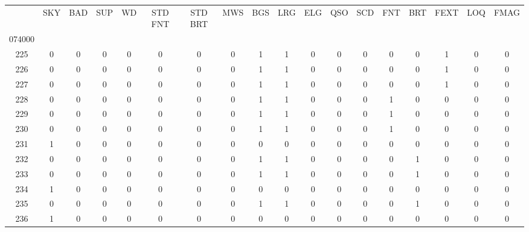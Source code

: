 \begin{tabular}{|c|c|c|c|c|c|c|c|c|c|c|c|c|c|c|c|c|c|}\toprule{} &  SKY &  BAD &  SUP &  WD &  STD FNT &  STD BRT &  MWS &  BGS &  LRG &  ELG &  QSO &  SCD &  FNT &  BRT &  FEXT &  LOQ &  FMAG \\074000 &      &      &      &     &          &          &      &      &      &      &      &      &      &      &       &      &       \\\midrule225    &    0 &    0 &    0 &   0 &        0 &        0 &    0 &    1 &    1 &    0 &    0 &    0 &    0 &    0 &     1 &    0 &     0 \\
\midrule
226    &    0 &    0 &    0 &   0 &        0 &        0 &    0 &    1 &    1 &    0 &    0 &    0 &    0 &    0 &     1 &    0 &     0 \\
\midrule
227    &    0 &    0 &    0 &   0 &        0 &        0 &    0 &    1 &    1 &    0 &    0 &    0 &    0 &    0 &     1 &    0 &     0 \\
\midrule
228    &    0 &    0 &    0 &   0 &        0 &        0 &    0 &    1 &    1 &    0 &    0 &    0 &    1 &    0 &     0 &    0 &     0 \\
\midrule
229    &    0 &    0 &    0 &   0 &        0 &        0 &    0 &    1 &    1 &    0 &    0 &    0 &    1 &    0 &     0 &    0 &     0 \\
\midrule
230    &    0 &    0 &    0 &   0 &        0 &        0 &    0 &    1 &    1 &    0 &    0 &    0 &    1 &    0 &     0 &    0 &     0 \\
\midrule
231    &    1 &    0 &    0 &   0 &        0 &        0 &    0 &    0 &    0 &    0 &    0 &    0 &    0 &    0 &     0 &    0 &     0 \\
\midrule
232    &    0 &    0 &    0 &   0 &        0 &        0 &    0 &    1 &    1 &    0 &    0 &    0 &    0 &    1 &     0 &    0 &     0 \\
\midrule
233    &    0 &    0 &    0 &   0 &        0 &        0 &    0 &    1 &    1 &    0 &    0 &    0 &    0 &    1 &     0 &    0 &     0 \\
\midrule
234    &    1 &    0 &    0 &   0 &        0 &        0 &    0 &    0 &    0 &    0 &    0 &    0 &    0 &    0 &     0 &    0 &     0 \\
\midrule
235    &    0 &    0 &    0 &   0 &        0 &        0 &    0 &    1 &    1 &    0 &    0 &    0 &    0 &    1 &     0 &    0 &     0 \\
\midrule
236    &    1 &    0 &    0 &   0 &        0 &        0 &    0 &    0 &    0 &    0 &    0 &    0 &    0 &    0 &     0 &    0 &     0 \\

\end{tabular}
